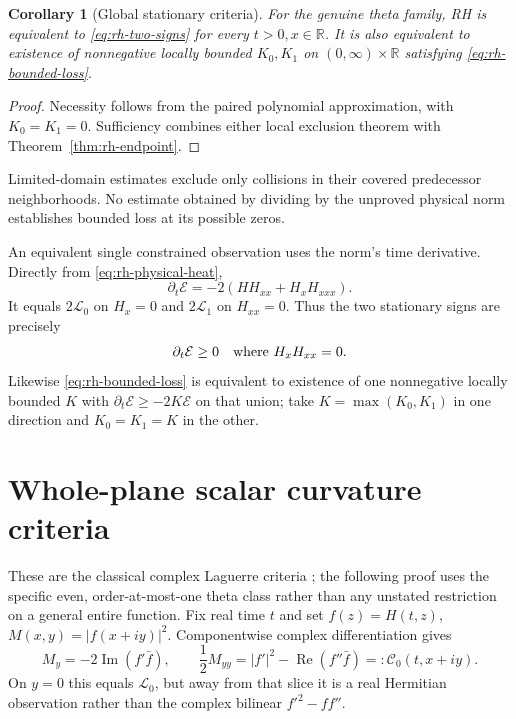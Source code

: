 \documentclass[11pt]{article}
\numberwithin{equation}{section}
\newtheorem{corollary}[theorem]{Corollary}
\theoremstyle{definition}
\theoremstyle{remark}
\begin{document}
\begin{corollary}[Global stationary criteria]\label{cor:rh-global-signs}
For the genuine theta family, RH is equivalent to
\eqref{eq:rh-two-signs} for every $t>0,x\in\mathbb R$.  It is also
equivalent to existence of nonnegative locally bounded $K_0,K_1$ on
$(0,\infty)\times\mathbb R$ satisfying \eqref{eq:rh-bounded-loss}.
\end{corollary}
\begin{proof}
Necessity follows from the paired polynomial approximation, with
$K_0=K_1=0$.  Sufficiency combines either local exclusion theorem with
Theorem~\ref{thm:rh-endpoint}.
\end{proof}
Limited-domain estimates exclude only collisions in their covered
predecessor neighborhoods.  No estimate obtained by dividing by the
unproved physical norm establishes bounded loss at its possible zeros.

An equivalent single constrained observation uses the norm's time
derivative.  Directly from \eqref{eq:rh-physical-heat},
\[
 \partial_t\mathcal E=-2(HH_{xx}+H_xH_{xxx}).
\]
It equals $2\mathscr L_0$ on $H_x=0$ and $2\mathscr L_1$ on
$H_{xx}=0$.  Thus the two stationary signs are precisely
\begin{equation}
 \partial_t\mathcal E\ge0\quad\hbox{where }H_xH_{xx}=0.
 \label{eq:rh-unified-stationary}
\end{equation}
Likewise \eqref{eq:rh-bounded-loss} is equivalent to existence of one
nonnegative locally bounded $K$ with
$\partial_t\mathcal E\ge-2K\mathcal E$ on that union; take
$K=\max(K_0,K_1)$ in one direction and $K_0=K_1=K$ in the other.

\section{Whole-plane scalar curvature criteria}
\label{sec:rh-complex-curvature}

These are the classical complex Laguerre criteria
\cite[Theorems 2.3--2.4]{csordasescassut}; the following proof
uses the specific even, order-at-most-one theta class rather than any
unstated restriction on a general entire function.
Fix real time $t$ and set $f(z)=H(t,z)$,
$M(x,y)=|f(x+iy)|^2$.  Componentwise complex differentiation gives
\begin{equation}
 M_y=-2\operatorname{Im}(f'\bar f),\qquad
 \frac12M_{yy}=|f'|^2-\operatorname{Re}(f''\bar f)
 =:\mathcal C_0(t,x+iy).
 \label{eq:rh-Hermitian-curvature}
\end{equation}
On $y=0$ this equals $\mathscr L_0$, but away from that slice it
is a real Hermitian observation rather than the complex bilinear
$f'^2-ff''$.
\end{document}
